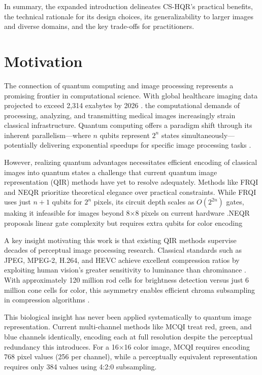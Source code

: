 \documentclass[11pt,a4paper]{article}
\begin{document}
In summary, the expanded introduction delineates CS-HQR's practical benefits, the technical rationale for its design choices, its generalizability to larger images and diverse domains, and the key trade-offs for practitioners.
\section{Motivation}
\label{sec:motivation}

The connection of quantum computing and image processing represents a promising frontier in computational science. With global healthcare imaging data projected to exceed 2,314 exabytes by 2026 \cite{ref1}. the computational demands of processing, analyzing, and transmitting medical images increasingly strain classical infrastructure. Quantum computing offers a paradigm shift through its inherent parallelism—where $n$ qubits represent $2^n$ states simultaneously—potentially delivering exponential speedups for specific image processing tasks \cite{ref2}.

However, realizing quantum advantages necessitates efficient encoding of classical images into quantum states a challenge that current quantum image representation (QIR) methods have yet to resolve adequately. Methods like FRQI \cite{ref3}and NEQR \cite{ref4} prioritize theoretical elegance over practical constraints. While FRQI uses just $n+1$ qubits for $2^n$ pixels, its circuit depth scales as $O(2^{2n})$ gates, making it infeasible for images beyond 8×8 pixels on current hardware \cite{ref5}.NEQR proposals linear gate complexity but requires extra qubits for color encoding

A key insight motivating this work is that existing QIR methods supervise decades of perceptual image processing research. Classical standards such as JPEG, MPEG-2, H.264, and HEVC achieve excellent compression ratios by exploiting human vision's greater sensitivity to luminance than chrominance \cite{ref6}. With approximately 120 million rod cells for brightness detection versus just 6 million cone cells for color, this asymmetry enables efficient chroma subsampling in compression algorithms \cite{ref7}.

This biological insight has never been applied systematically to quantum image representation. Current multi-channel methods like MCQI \cite{ref8} treat red, green, and blue channels identically, encoding each at full resolution despite the perceptual redundancy this introduces. For a 16×16 color image, MCQI requires encoding 768 pixel values (256 per channel), while a perceptually equivalent representation requires only 384 values using 4:2:0 subsampling.
\end{document}
